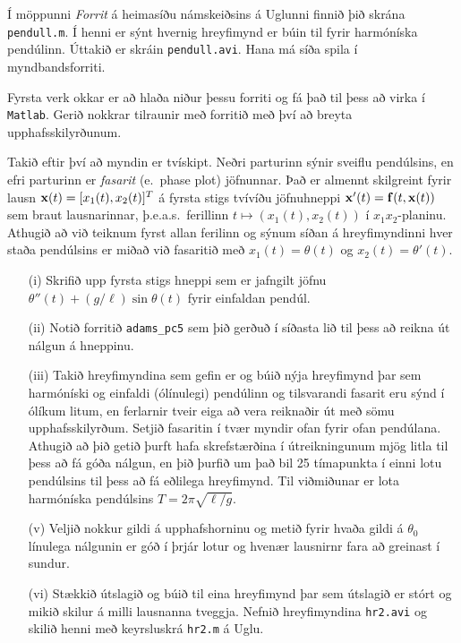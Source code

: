 \documentclass[11pt,icelandic]{article}
\newcommand{\xv}{\mbox{${\bf x}$}}
\newcommand{\fv}{\mbox{${\bf f}$}}
\begin{document}
Í möppunni {\it Forrit} á heimasíðu námskeiðsins á Uglunni finnið
þið skrána {\tt pendull.m}.  Í henni er sýnt hvernig hreyfimynd er
búin til fyrir harmóníska pendúlinn. Úttakið er 
skráin {\tt pendull.avi}.  Hana má síða spila í myndbandsforriti.


\smallskip
Fyrsta verk okkar er að hlaða niður þessu forriti og fá það til þess
að virka í {\tt Matlab}.  Gerið nokkrar tilraunir með forritið með því
að  breyta upphafsskilyrðunum.  


\smallskip
Takið eftir því að myndin er tvískipt.  Neðri parturinn sýnir sveiflu
pendúlsins, en efri parturinn er {\it fasarit} (e.~phase plot) 
jöfnunnar.  Það er almennt skilgreint fyrir lausn
$\xv(t)=[x_1(t),x_2(t)]^T$ á fyrsta 
stigs tvívíðu jöfnuhneppi  $\xv'(t)=\fv(t,\xv(t))$ sem braut 
lausnarinnar, þ.e.a.s.~ferillinn $t\mapsto (x_1(t),x_2(t))$ í 
$x_1x_2$-planinu.  Athugið að við teiknum fyrst allan ferilinn og
sýnum síðan á hreyfimyndinni hver staða pendúlsins er miðað við
fasaritið með $x_1(t)=\theta(t)$ og $x_2(t)=\theta'(t)$. 




\begin{enumerate}
\item [(i)]  Skrifið  upp fyrsta stigs hneppi 
sem er jafngilt jöfnu  $\theta''(t)+(g/\ell)\sin\theta(t)$
fyrir einfaldan pendúl.
\item [(ii)]  
Notið forritið {\tt adams{\_}pc5} sem þið gerðuð í síðasta lið
til þess að reikna út nálgun á hneppinu.
\item [(iii)]
Takið hreyfimyndina sem gefin er og búið nýja hreyfimynd 
þar sem harmóníski og einfaldi (ólínulegi) pendúlinn og 
tilsvarandi fasarit eru sýnd í ólíkum litum, en ferlarnir 
tveir eiga að vera  reiknaðir út með 
sömu upphafsskilyrðum.  Setjið fasaritin í tvær myndir
ofan fyrir ofan pendúlana.  Athugið að  þið getið þurft 
hafa  skrefstærðina í útreikningunum mjög litla til þess 
að fá góða nálgun, en þið þurfið um það bil 25 tímapunkta 
í einni lotu pendúlsins til þess að fá eðlilega hreyfimynd.  
Til viðmiðunar er lota harmóníska pendúlsins $T=2\pi\sqrt{\ell/g}$.
\item [(v)]  
Veljið nokkur gildi á upphafshorninu og metið fyrir
hvaða gildi á $\theta_0$ línulega nálgunin er góð í þrjár lotur og
hvenær lausnirnr fara að greinast í sundur.
 \item [(vi)]  Stækkið útslagið og búið til eina hreyfimynd þar sem
útslagið er stórt og mikið skilur á milli lausnanna tveggja.
Nefnið hreyfimyndina {\tt hr2.avi}  og
skilið henni með keyrsluskrá {\tt hr2.m} á Uglu.
\end{enumerate}
\end{document}
